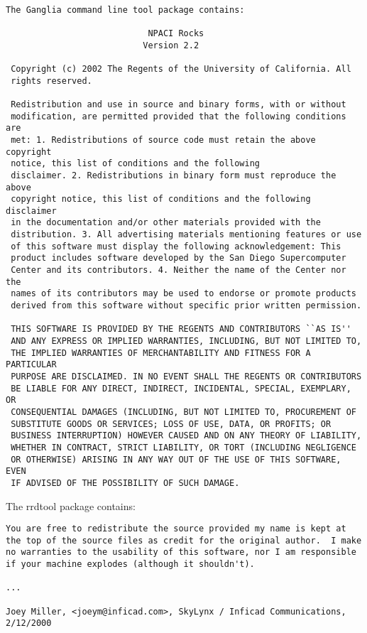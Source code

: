 \begin{verbatim}

The Ganglia command line tool package contains:

                            NPACI Rocks
                           Version 2.2

 Copyright (c) 2002 The Regents of the University of California. All
 rights reserved.

 Redistribution and use in source and binary forms, with or without
 modification, are permitted provided that the following conditions are
 met: 1. Redistributions of source code must retain the above copyright
 notice, this list of conditions and the following
 disclaimer. 2. Redistributions in binary form must reproduce the above
 copyright notice, this list of conditions and the following disclaimer
 in the documentation and/or other materials provided with the
 distribution. 3. All advertising materials mentioning features or use
 of this software must display the following acknowledgement: This
 product includes software developed by the San Diego Supercomputer
 Center and its contributors. 4. Neither the name of the Center nor the
 names of its contributors may be used to endorse or promote products
 derived from this software without specific prior written permission.

 THIS SOFTWARE IS PROVIDED BY THE REGENTS AND CONTRIBUTORS ``AS IS''
 AND ANY EXPRESS OR IMPLIED WARRANTIES, INCLUDING, BUT NOT LIMITED TO,
 THE IMPLIED WARRANTIES OF MERCHANTABILITY AND FITNESS FOR A PARTICULAR
 PURPOSE ARE DISCLAIMED. IN NO EVENT SHALL THE REGENTS OR CONTRIBUTORS
 BE LIABLE FOR ANY DIRECT, INDIRECT, INCIDENTAL, SPECIAL, EXEMPLARY, OR
 CONSEQUENTIAL DAMAGES (INCLUDING, BUT NOT LIMITED TO, PROCUREMENT OF
 SUBSTITUTE GOODS OR SERVICES; LOSS OF USE, DATA, OR PROFITS; OR
 BUSINESS INTERRUPTION) HOWEVER CAUSED AND ON ANY THEORY OF LIABILITY,
 WHETHER IN CONTRACT, STRICT LIABILITY, OR TORT (INCLUDING NEGLIGENCE
 OR OTHERWISE) ARISING IN ANY WAY OUT OF THE USE OF THIS SOFTWARE, EVEN
 IF ADVISED OF THE POSSIBILITY OF SUCH DAMAGE.
\end{verbatim}

The rrdtool package contains:

\begin{verbatim}
You are free to redistribute the source provided my name is kept at
the top of the source files as credit for the original author.  I make
no warranties to the usability of this software, nor I am responsible
if your machine explodes (although it shouldn't).

...

Joey Miller, <joeym@inficad.com>, SkyLynx / Inficad Communications,
2/12/2000
\end{verbatim}

